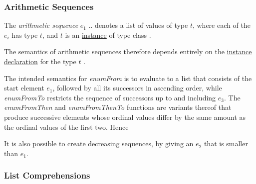 \subsubsection{Arithmetic Sequences}  
\label{aseq}

The \emph{arithmetic sequence} \bracka{}$e_1$  .. \brackz{} 
denotes a list of values of type $t$, 
where each of the $e_i$ has type $t$, and $t$ is an \hyperref[instance]{instance} of type class .


The semantics of arithmetic sequences therefore depends entirely on the \hyperref[instdcl]{instance declaration}
for the type $t$ .

The intended semantics for \emph{enumFrom} is to evaluate to a list that consists of the start element $e_1$, followed by all its successors in ascending order, while \emph{enumFromTo} restricts the sequence of successors up to and including $e_3$. The \emph{enumFromThen} and \emph{enumFromThenTo} functions are variants thereof that produce successive elements whose ordinal values differ by the same amount as the ordinal values of the first two. Hence


It is also possible to create decreasing sequences, by giving an $e_2$ that is smaller than $e_1$.

\subsubsection{List Comprehensions}  


